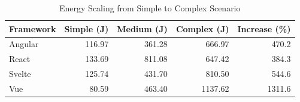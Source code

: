 \begin{table}[htbp]
\centering
\caption{Energy Scaling from Simple to Complex Scenario}
\label{tab:scaling}
\begin{tabular}{lrrrr}
\toprule
\textbf{Framework} & \textbf{Simple (J)} & \textbf{Medium (J)} & \textbf{Complex (J)} & \textbf{Increase (\%)} \\
\midrule
Angular  &  116.97 &  361.28 &  666.97 &  470.2 \\
React    &  133.69 &  811.08 &  647.42 &  384.3 \\
Svelte   &  125.74 &  431.70 &  810.50 &  544.6 \\
Vue      &   80.59 &  463.40 & 1137.62 & 1311.6 \\
\bottomrule
\end{tabular}
\end{table}